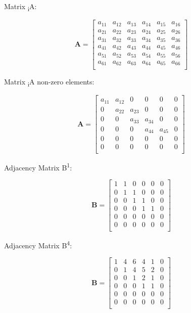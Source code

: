 \documentclass[
  letterpaper,
  DIV=11,
  numbers=noendperiod]{scrartcl}
\begin{document}
Matrix \textsubscript{i}A:

\[\mathbf{A} = \left[\begin{array}
{rrr}
a_{11} & a_{12} & a_{13} & a_{14} & a_{15} & a_{16} \\
a_{21} & a_{22} & a_{23} & a_{24} & a_{25} & a_{26} \\
a_{31} & a_{32} & a_{33} & a_{34} & a_{35} & a_{36} \\
a_{41} & a_{42} & a_{43} & a_{44} & a_{45} & a_{46} \\
a_{51} & a_{52} & a_{53} & a_{54} & a_{55} & a_{56} \\
a_{61} & a_{62} & a_{63} & a_{64} & a_{65} & a_{66} \\
\end{array}\right]
\]

Matrix \textsubscript{i}A non-zero elements:

\[\mathbf{A} = \left[\begin{array}
{rrr}
a_{11} & a_{12} & 0 & 0 & 0 & 0 \\
0 & a_{22} & a_{23} & 0 & 0 & 0 \\
0 & 0 & a_{33} & a_{34} & 0 & 0 \\
0 & 0 & 0 & a_{44} & a_{45} & 0 \\
0 & 0 & 0 & 0 & 0 & 0 \\
0 & 0 & 0 & 0 & 0 & 0 \\
\end{array}\right]
\]

Adjacency Matrix B\textsuperscript{1}:

\[\mathbf{B} = \left[\begin{array}
{rrr}
1 & 1 & 0 & 0 & 0 & 0 \\
0 & 1 & 1 & 0 & 0 & 0 \\
0 & 0 & 1 & 1 & 0 & 0 \\
0 & 0 & 0 & 1 & 1 & 0 \\
0 & 0 & 0 & 0 & 0 & 0 \\
0 & 0 & 0 & 0 & 0 & 0 \\
\end{array}\right]
\]

Adjacency Matrix B\textsuperscript{4}:

\[\mathbf{B} = \left[\begin{array}
{rrr}
1 & 4 & 6 & 4 & 1 & 0 \\
0 & 1 & 4 & 5 & 2 & 0 \\
0 & 0 & 1 & 2 & 1 & 0 \\
0 & 0 & 0 & 1 & 1 & 0 \\
0 & 0 & 0 & 0 & 0 & 0 \\
0 & 0 & 0 & 0 & 0 & 0 \\
\end{array}\right]
\]
\end{document}
